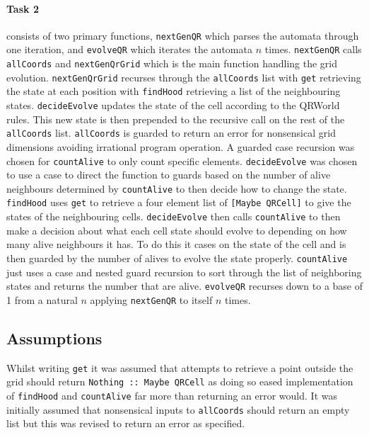 \documentclass[11pt]{article}
\begin{document}
\paragraph{Task 2} consists of two primary functions, \verb|nextGenQR| which parses the automata through one iteration, and \verb|evolveQR| which iterates the automata $n$ times. \verb|nextGenQR| calls  \verb|allCoords| and \verb|nextGenQrGrid| which is the main function handling the grid evolution. \verb|nextGenQrGrid| recurses through the \verb|allCoords| list with  \verb|get| retrieving the state at each position with \verb|findHood| retrieving a list of the neighbouring states.  \verb|decideEvolve| updates the state of the cell according to the QRWorld rules. This new state is then prepended to the recursive call on the rest of the \verb|allCoords| list.  \verb|allCoords| is guarded to return an error for nonsensical grid dimensions avoiding irrational program operation. A guarded case recursion was chosen for \verb|countAlive| to only count specific elements. \verb|decideEvolve| was chosen to use a case to direct the function to guards based on the number of alive neighbours determined by \verb|countAlive| to then decide how to change  the state. \verb|findHood| uses \verb|get| to retrieve a four element list of \verb|[Maybe QRCell]| to give the states of the neighbouring cells. \verb|decideEvolve| then calls \verb|countAlive| to then make a decision about what each cell state should evolve to depending on how many alive neighbours it has. To do this it cases on the state of the cell and is then guarded by the number of alives to evolve the state properly. \verb|countAlive| just uses a case and nested guard recursion to sort through the list of neighboring states and returns the number that are alive. \verb|evolveQR| recurses down to a base of 1 from a natural $n$ applying \verb|nextGenQR| to itself $n$ times.


 \subsection{Assumptions}%
Whilst writing \verb|get| it was assumed that attempts to retrieve a point outside the grid should return \verb|Nothing :: Maybe QRCell| as doing so eased implementation of \verb|findHood| and \verb|countAlive| far more than returning an error would. It was initially assumed that nonsensical inputs to \verb|allCoords| should return an empty list but this was revised to return an error as specified.
\end{document}
